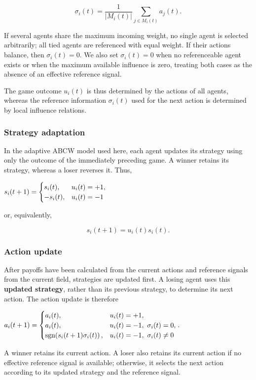 \documentclass[
  11pt,
]{article}
\begin{document}
\[{\sigma_i(t)=\frac{1}{|M_i(t)|}\sum_{j\in M_i(t)}a_j(t).}\]

If several agents share the maximum incoming weight, no single agent is
selected arbitrarily; all tied agents are referenced with equal weight.
If their actions balance, then \({\sigma_i(t)=0}\). We also set
\({\sigma_i(t)=0}\) when no referenceable agent exists or when the
maximum available influence is zero, treating both cases as the absence
of an effective reference signal.

The game outcome \({u_i(t)}\) is thus determined by the actions of all
agents, whereas the reference information \({\sigma_i(t)}\) used for the
next action is determined by local influence relations.

\hypertarget{strategy-adaptation}{%
\subsubsection{Strategy adaptation}\label{strategy-adaptation}}

In the adaptive ABCW model used here, each agent updates its strategy
using only the outcome of the immediately preceding game. A winner
retains its strategy, whereas a loser reverses it. Thus,

\({s_i(t+1)= \begin{cases} s_i(t),&u_i(t)=+1,\cr -s_i(t),&u_i(t)=-1 \end{cases}}\)

or, equivalently,

\[{s_i(t+1)=u_i(t)s_i(t).}\]

\hypertarget{action-update}{%
\subsubsection{Action update}\label{action-update}}

After payoffs have been calculated from the current actions and
reference signals from the current field, strategies are updated first.
A losing agent uses this \textbf{updated strategy}, rather than its
previous strategy, to determine its next action. The action update is
therefore

\({a_i(t+1)= \begin{cases} a_i(t),&u_i(t)=+1,\cr a_i(t),&u_i(t)=-1,\ \sigma_i(t)=0,\cr \operatorname{sgn}\!\left(s_i(t+1)\sigma_i(t)\right),&u_i(t)=-1,\ \sigma_i(t)\neq0 \end{cases}.}\)

A winner retains its current action. A loser also retains its current
action if no effective reference signal is available; otherwise, it
selects the next action according to its updated strategy and the
reference signal.
\end{document}
